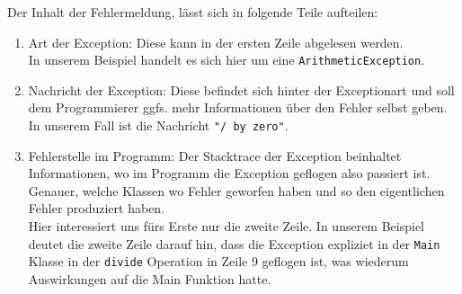 \begin{Infobox}[Exception]
    Der Inhalt der Fehlermeldung, lässt sich in folgende Teile aufteilen:

    \begin{enumerate}[label=\roman*)]
        \item Art der Exception: Diese kann in der ersten Zeile abgelesen werden.\\
            In unserem Beispiel handelt es sich hier um eine \lstinline{ArithmeticException}.
        \item Nachricht der Exception: Diese befindet sich hinter der Exceptionart und soll dem Programmierer ggfs. mehr Informationen über den Fehler selbst geben.\\
            In unserem Fall ist die Nachricht \lstinline{"/ by zero"}.
        \item Fehlerstelle im Programm: Der Stacktrace der Exception beinhaltet Informationen, wo im Programm die Exception geflogen also passiert ist. Genauer, welche Klassen wo Fehler geworfen haben und so den eigentlichen Fehler produziert haben.\\
            Hier interessiert uns fürs Erste nur die zweite Zeile. In unserem Beispiel deutet die zweite Zeile darauf hin, dass die Exception expliziet in der \lstinline{Main} Klasse in der \lstinline{divide}
        Operation in Zeile 9 geflogen ist, was wiederum Auswirkungen auf die Main Funktion hatte. 
    \end{enumerate}

\end{Infobox}


